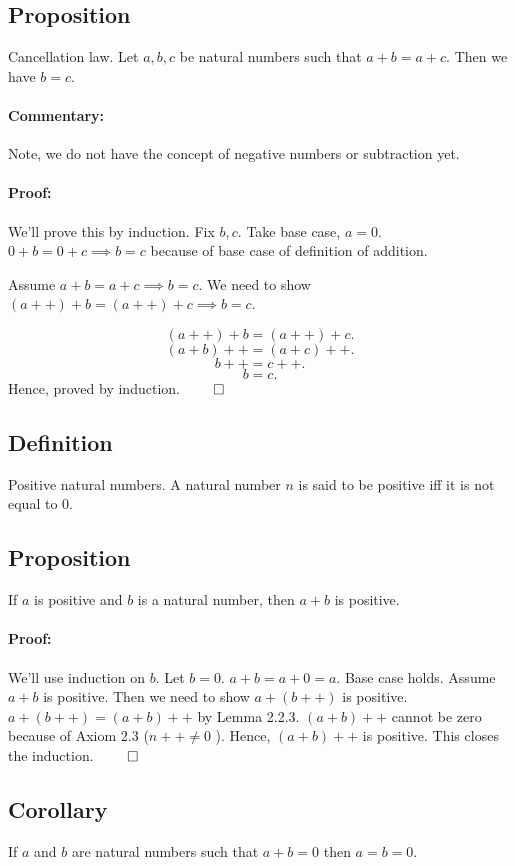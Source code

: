 \documentclass{report}
\begin{document}
\subsection{Proposition} Cancellation law. Let  $a,b,c$ be natural numbers such that $a+b = a + c$. Then we have $b=c$.
 \paragraph{Commentary: }Note, we do not have the concept of negative numbers or subtraction yet.
\paragraph{Proof: }We'll prove this by induction. Fix $b,c$. Take base case,  $a = 0 $. $0+b = 0 + c \implies b = c$ because of base case of definition of addition.

Assume $a+b = a+c \implies b = c$. We need to show $\left( a++ \right) +b =  \left( a ++ \right) + c \implies b = c $.

\[
\left( a++ \right) + b = \left( a++ \right) +c 
.\] 
 \[
	 \left( a+b \right) ++ = \left( a+c \right) ++ \tag{by defintion of addition}
.\]
\[
	b++ = c++ \tag{by assumption of the induction step}
.\] 
\[
b = c
.\] 
Hence, proved by induction.  $\qed$

\subsection{Definition} Positive natural numbers. A natural number $n$ is said to be positive iff it is not equal to $0$. 

\subsection{Proposition} If $a$ is positive and $b$ is a natural number, then $a+b$ is positive.
 \paragraph{Proof: } We'll use induction on $b$. Let $b = 0$. $a + b = a + 0 =  a$. Base case holds. Assume $a+b$ is positive. Then we need to show $a+\left( b++ \right) $ is positive. $a + \left( b++ \right) = \left( a+b \right) ++$ by Lemma 2.2.3. $\left( a+b \right) ++ $ cannot be zero because of Axiom $2.3$ ($n++ \neq 0$ ). Hence, $\left( a+b \right) ++$ is positive. This closes the induction. $\qed$

 \subsection{Corollary} If $a$ and $b$ are natural numbers such that $a + b = 0$ then $a=b=0$.
\end{document}
